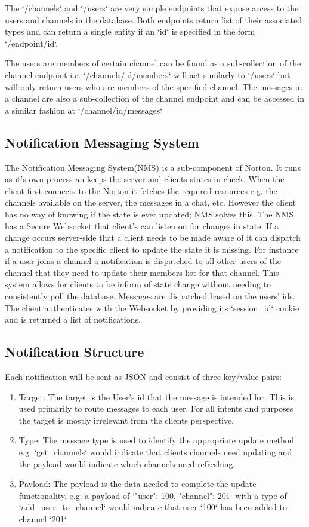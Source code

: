 The `/channels` and `/users` are very simple endpoints that expose access to the users and channels in the database.
Both endpoints return list of their associated types and can return a single entity if an `id` is specified in the form
`/endpoint/id`.

The users are members of certain channel can be found as a sub-collection of the channel endpoint i.e.
`/channels/id/members` will act similarly to `/users` but will only return users who are members of the specified
channel. The messages in a channel are also a sub-collection of the channel endpoint and can be accessed in a similar
fashion at `/channel/id/messages`

\subsection{Notification Messaging System}
The Notification Messaging System(NMS) is a sub-component of Norton. It runs as it's own process an keeps the server and
clients states in check. When the client first connects to the Norton it fetches the required resources e.g. the
channels available on the server, the messages in a chat, etc. However the client has no way of knowing if the state is
ever updated; NMS solves this. The NMS has a Secure Websocket that client's can listen on for changes in state. If a
change occurs server-side that a client needs to be made aware of it can dispatch a notification to the specific client
to update the state it is missing. For instance if a user joins a channel a notification is dispatched to all other
users of the channel that they need to update their members list for that channel. This system allows for clients to be
inform of state change without needing to consistently poll the database. Messages are dispatched based on the users'
ids. The client authenticates with the Websocket by providing its `session\_id` cookie and is returned a list of
notifications.

\subsection{Notification Structure}
Each notification will be sent as JSON and consist of three key/value pairs:
\begin{enumerate}
\item Target: The target is the User's id that the message is intended for. This is used primarily to route messages to each user. For all intents and purposes the target is mostly irrelevant from the clients perspective.
\item Type: The message type is used to identify the appropriate update method e.g. `get\_channels` would indicate that clients channels need updating and the payload would indicate which channels need refreshing.
\item Payload: The payload is the data needed to complete the update functionality. e.g. a payload of `{"user": 100, "channel": 201}` with a type of `add\_user\_to\_channel` would indicate that user `100` has been added to channel `201`
\end{enumerate}

